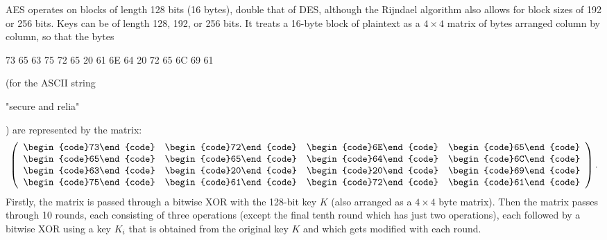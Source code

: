 AES operates on blocks of length 128 bits (16 bytes), double that of DES,
although the Rijndael algorithm also allows for block sizes of 192 or 256 bits.
Keys can be of length 128, 192, or 256 bits.
It treats a 16-byte block of plaintext as a $4\times4$ matrix of bytes arranged
column by column,
so that the bytes \begin{code}73 65 63 75 72 65 20 61 6E 64 20 72 65 6C 69 61\end{code}
(for the ASCII string \begin{code}"secure and relia"\end{code})
are represented by the matrix:
\begin{displaymath}
\left(\begin{array}{cccc}
  \mbox{\begin{code}73\end{code}} & \mbox{\begin{code}72\end{code}}
    & \mbox{\begin{code}6E\end{code}} & \mbox{\begin{code}65\end{code}} \\
  \mbox{\begin{code}65\end{code}} & \mbox{\begin{code}65\end{code}}
    & \mbox{\begin{code}64\end{code}} & \mbox{\begin{code}6C\end{code}} \\
  \mbox{\begin{code}63\end{code}} & \mbox{\begin{code}20\end{code}}
    & \mbox{\begin{code}20\end{code}} & \mbox{\begin{code}69\end{code}} \\
  \mbox{\begin{code}75\end{code}} & \mbox{\begin{code}61\end{code}}
    & \mbox{\begin{code}72\end{code}} & \mbox{\begin{code}61\end{code}}
\end{array}\right).
\end{displaymath}
Firstly, the matrix is passed through a bitwise XOR with the 128-bit key $K$
(also arranged as a $4\times4$ byte matrix).
Then the matrix passes through 10 rounds, each consisting of three
operations (except the final tenth round which has just two operations),
each followed by a bitwise XOR using a key $K_i$ that is obtained
from the original key $K$ and which gets modified with each round.

